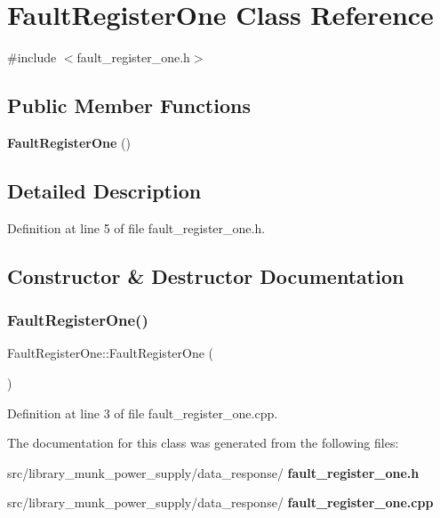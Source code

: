 \section{Fault\+Register\+One Class Reference}
\label{class_fault_register_one}


{\ttfamily \#include $<$fault\+\_\+register\+\_\+one.\+h$>$}

\subsection*{Public Member Functions}
\begin{DoxyCompactItemize}
\item 
\textbf{ Fault\+Register\+One} ()
\end{DoxyCompactItemize}


\subsection{Detailed Description}


Definition at line 5 of file fault\+\_\+register\+\_\+one.\+h.



\subsection{Constructor \& Destructor Documentation}
\mbox{\label{class_fault_register_one_a2b7823f17c65239256861f3c3120c569}} 
\subsubsection{Fault\+Register\+One()}
{\footnotesize\ttfamily Fault\+Register\+One\+::\+Fault\+Register\+One (\begin{DoxyParamCaption}{ }\end{DoxyParamCaption})}



Definition at line 3 of file fault\+\_\+register\+\_\+one.\+cpp.



The documentation for this class was generated from the following files\+:\begin{DoxyCompactItemize}
\item 
src/library\+\_\+munk\+\_\+power\+\_\+supply/data\+\_\+response/\textbf{ fault\+\_\+register\+\_\+one.\+h}\item 
src/library\+\_\+munk\+\_\+power\+\_\+supply/data\+\_\+response/\textbf{ fault\+\_\+register\+\_\+one.\+cpp}\end{DoxyCompactItemize}
